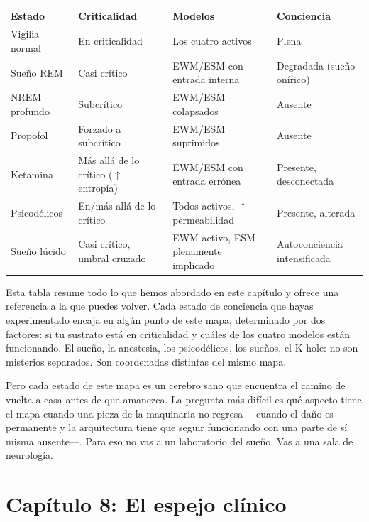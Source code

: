 \documentclass[11pt, twoside, openright]{book}
\begin{document}
\small
\begin{xltabular}{\linewidth}{X X X X}
\toprule
\textbf{Estado} & \textbf{Criticalidad} & \textbf{Modelos} & \textbf{Conciencia} \\
\midrule\endhead
Vigilia normal & En criticalidad & Los cuatro activos & Plena \\[4pt]
Sueño REM & Casi crítico & EWM/\allowbreak{}ESM con entrada interna & Degradada (sueño onírico) \\[4pt]
NREM profundo & Subcrítico & EWM/\allowbreak{}ESM colapsados & Ausente \\[4pt]
Propofol & Forzado a subcrítico & EWM/\allowbreak{}ESM suprimidos & Ausente \\[4pt]
Ketamina & Más allá de lo crítico ($\uparrow$ entropía) & EWM/\allowbreak{}ESM con entrada errónea & Presente, desconectada \\[4pt]
Psicodélicos & En/\allowbreak{}más allá de lo crítico & Todos activos, $\uparrow$ permeabilidad & Presente, alterada \\[4pt]
Sueño lúcido & Casi crítico, umbral cruzado & EWM activo, ESM plenamente implicado & Autoconciencia intensificada \\[4pt]
\bottomrule
\end{xltabular}
\normalsize


Esta tabla resume todo lo que hemos abordado en este capítulo y ofrece una referencia a la que puedes volver. Cada estado de conciencia que hayas experimentado encaja en algún punto de este mapa, determinado por dos factores: si tu sustrato está en criticalidad y cuáles de los cuatro modelos están funcionando. El sueño, la anestesia, los psicodélicos, los sueños, el K-hole: no son misterios separados. Son coordenadas distintas del mismo mapa.

Pero cada estado de este mapa es un cerebro sano que encuentra el camino de vuelta a casa antes de que amanezca. La pregunta más difícil es qué aspecto tiene el mapa cuando una pieza de la maquinaria no regresa ---cuando el daño es permanente y la arquitectura tiene que seguir funcionando con una parte de sí misma ausente---. Para eso no vas a un laboratorio del sueño. Vas a una sala de neurología.


\chapter*{Capítulo 8: El espejo clínico}
\end{document}
